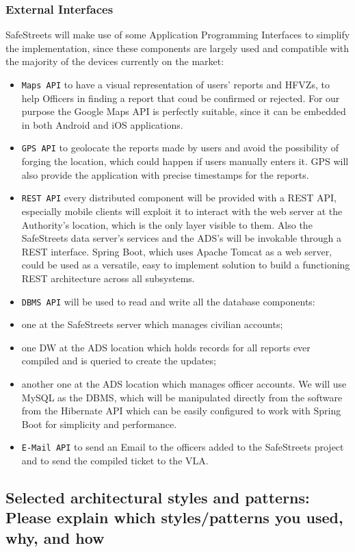 \documentclass[12pt,a4paper]{article}
\begin{document}
\subsubsection{External Interfaces}
SafeStreets will make use of some Application Programming Interfaces to simplify the implementation, since these components are largely used and compatible with the majority of the devices currently on the market:
\begin{itemize}
\item \texttt{Maps API} to have a visual representation of users' reports and HFVZs, to help Officers in finding a report that coud be confirmed or rejected. For our purpose the Google Maps API is perfectly suitable, since it can be embedded in both Android and iOS applications.
\item \texttt{GPS API} to geolocate the reports made by users and  avoid the possibility of forging the location, which could happen if users manually enters it. GPS will also provide the application with precise timestamps for the reports.
\item \texttt{REST API} every distributed component will be provided with a REST API, especially mobile clients will exploit it to interact with the web server at the Authority's location, which is the only layer visible to them. Also the SafeStreets data server's services and the ADS's will be invokable through a REST interface. Spring Boot, which uses Apache Tomcat as a web server, could be used as a versatile, easy to implement solution to build a functioning REST architecture across all subsystems.
\item \texttt{DBMS API} will be used to read and write all the database components:
\item one at the SafeStreets server which manages civilian accounts;
\item one DW at the ADS location which holds records for all reports ever compiled and is queried to create the updates;
\item another one at the ADS location which manages officer accounts.
We will use MySQL as the DBMS, which will be manipulated directly from the software from the Hibernate API which can be easily configured to work with Spring Boot for simplicity and performance.
\item \texttt{E-Mail API} to send an Email to the officers added to the SafeStreets project and to send the compiled ticket to the VLA. 
\end{itemize}
\subsection{Selected architectural styles and patterns: Please explain which styles/patterns you used, why, and how}
\end{document}
